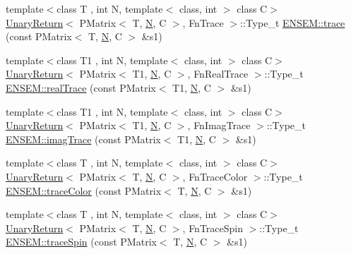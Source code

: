 \begin{DoxyCompactItemize}
\item 
{\footnotesize template$<$class T , int N, template$<$ class, int $>$ class C$>$ }\\\mbox{\hyperlink{structUnaryReturn}{Unary\+Return}}$<$ P\+Matrix$<$ T, \mbox{\hyperlink{adat__devel_2lib_2hadron_2operator__name__util_8cc_a7722c8ecbb62d99aee7ce68b1752f337}{N}}, C $>$, Fn\+Trace $>$\+::Type\+\_\+t \mbox{\hyperlink{group__primmatrix_gafc761796f6ca23ee43cd937f3459e3ce}{E\+N\+S\+E\+M\+::trace}} (const P\+Matrix$<$ T, \mbox{\hyperlink{adat__devel_2lib_2hadron_2operator__name__util_8cc_a7722c8ecbb62d99aee7ce68b1752f337}{N}}, C $>$ \&s1)
\item 
{\footnotesize template$<$class T1 , int N, template$<$ class, int $>$ class C$>$ }\\\mbox{\hyperlink{structUnaryReturn}{Unary\+Return}}$<$ P\+Matrix$<$ T1, \mbox{\hyperlink{adat__devel_2lib_2hadron_2operator__name__util_8cc_a7722c8ecbb62d99aee7ce68b1752f337}{N}}, C $>$, Fn\+Real\+Trace $>$\+::Type\+\_\+t \mbox{\hyperlink{group__primmatrix_gaf2db8b017f816bb958ba639899fa1cf7}{E\+N\+S\+E\+M\+::real\+Trace}} (const P\+Matrix$<$ T1, \mbox{\hyperlink{adat__devel_2lib_2hadron_2operator__name__util_8cc_a7722c8ecbb62d99aee7ce68b1752f337}{N}}, C $>$ \&s1)
\item 
{\footnotesize template$<$class T1 , int N, template$<$ class, int $>$ class C$>$ }\\\mbox{\hyperlink{structUnaryReturn}{Unary\+Return}}$<$ P\+Matrix$<$ T1, \mbox{\hyperlink{adat__devel_2lib_2hadron_2operator__name__util_8cc_a7722c8ecbb62d99aee7ce68b1752f337}{N}}, C $>$, Fn\+Imag\+Trace $>$\+::Type\+\_\+t \mbox{\hyperlink{group__primmatrix_gaa17cf25ee54da2665418c0cfbccc0ae9}{E\+N\+S\+E\+M\+::imag\+Trace}} (const P\+Matrix$<$ T1, \mbox{\hyperlink{adat__devel_2lib_2hadron_2operator__name__util_8cc_a7722c8ecbb62d99aee7ce68b1752f337}{N}}, C $>$ \&s1)
\item 
{\footnotesize template$<$class T , int N, template$<$ class, int $>$ class C$>$ }\\\mbox{\hyperlink{structUnaryReturn}{Unary\+Return}}$<$ P\+Matrix$<$ T, \mbox{\hyperlink{adat__devel_2lib_2hadron_2operator__name__util_8cc_a7722c8ecbb62d99aee7ce68b1752f337}{N}}, C $>$, Fn\+Trace\+Color $>$\+::Type\+\_\+t \mbox{\hyperlink{group__primmatrix_ga1d05c45afa351dba712d9d083a013d41}{E\+N\+S\+E\+M\+::trace\+Color}} (const P\+Matrix$<$ T, \mbox{\hyperlink{adat__devel_2lib_2hadron_2operator__name__util_8cc_a7722c8ecbb62d99aee7ce68b1752f337}{N}}, C $>$ \&s1)
\item 
{\footnotesize template$<$class T , int N, template$<$ class, int $>$ class C$>$ }\\\mbox{\hyperlink{structUnaryReturn}{Unary\+Return}}$<$ P\+Matrix$<$ T, \mbox{\hyperlink{adat__devel_2lib_2hadron_2operator__name__util_8cc_a7722c8ecbb62d99aee7ce68b1752f337}{N}}, C $>$, Fn\+Trace\+Spin $>$\+::Type\+\_\+t \mbox{\hyperlink{group__primmatrix_gaaf91f3c1c18cadfc208acd80fd80ab0b}{E\+N\+S\+E\+M\+::trace\+Spin}} (const P\+Matrix$<$ T, \mbox{\hyperlink{adat__devel_2lib_2hadron_2operator__name__util_8cc_a7722c8ecbb62d99aee7ce68b1752f337}{N}}, C $>$ \&s1)

\end{DoxyCompactItemize}
